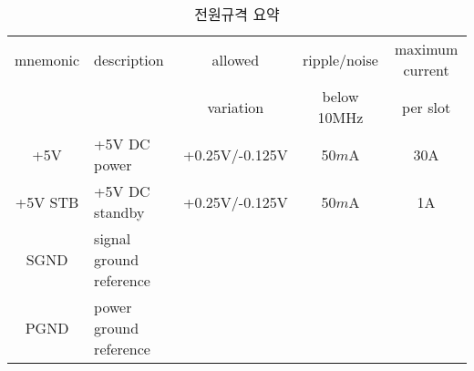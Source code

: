%
%
\begin{table}[htbp]
\caption{전원규격 요약}\label{table:power-spec}
   \begin{center}
   \begin{tabular}{|c|l|c|c|c|} \hline
	mnemonic & description & allowed   & ripple/noise & maximum current \\
	         &             & variation & below 10MHz  & per slot \\ \hline
\hline
	+5V & +5V DC power & +0.25V/-0.125V & 50$m$A & 30A \\ \hline
	+5V STB & +5V DC standby & +0.25V/-0.125V & 50$m$A & 1A \\ \hline
	SGND & signal ground reference & & & \\ \hline
	PGND & power ground reference & & & \\ \hline
   \end{tabular}
   \end{center}
\end{table}
%
%
